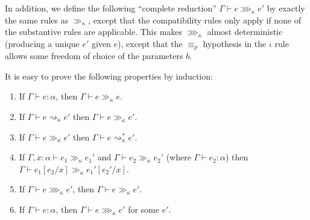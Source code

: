 In addition, we define the following ``complete reduction'' $\Gamma\vdash e\ggg_\kappa e'$ by exactly the same rules as $\gg_\kappa$, except that the compatibility rules only apply if none of the substantive rules are applicable. This makes $\ggg_\kappa$ almost deterministic (producing a unique $e'$ given $e$), except that the $\equiv_p$ hypothesis in the $\iota$ rule allows some freedom of choice of the parameters $b$.

It is easy to prove the following properties by induction:
\begin{lemma}\label{gg_prop}
\begin{enumerate}
\item If $\Gamma\vdash e:\alpha$, then $\Gamma\vdash e\gg_\kappa e$.
\item\label{red_gg} If $\Gamma\vdash e\rightsquigarrow_\kappa e'$ then $\Gamma\vdash e\gg_\kappa e'$.
\item\label{gg_red} If $\Gamma\vdash e\gg_\kappa e'$ then $\Gamma\vdash e\rightsquigarrow_\kappa^* e'$.
\item\label{gg_subst} If $\Gamma,x:\alpha\vdash e_1\gg_\kappa e_1'$ and $\Gamma\vdash e_2\gg_\kappa e_2'$ (where $\Gamma\vdash e_2:\alpha$) then\\ $\Gamma\vdash e_1[e_2/x]\gg_\kappa e_1'[e_2'/x]$.
\item\label{ggg_gg} If $\Gamma\vdash e\ggg_\kappa e'$, then $\Gamma\vdash e\gg_\kappa e'$.
\item\label{ggg_ex} If $\Gamma\vdash e:\alpha$, then $\Gamma\vdash e\ggg_\kappa e'$ for some $e'$.
\end{enumerate}
\end{lemma}

